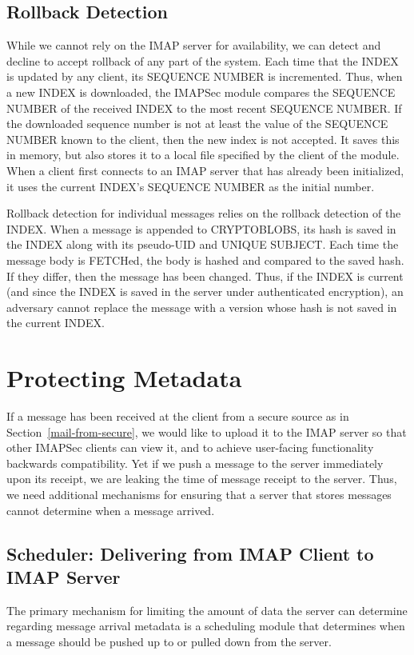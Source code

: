 \documentclass[pageno]{jpaper}
\newcommand{\project}{IMAPSec }
\begin{document}
\label{rollback}
\subsection{Rollback Detection}
While we cannot rely on the IMAP server for availability, we can detect and decline to accept rollback of any part of the system. Each time that the INDEX is updated by any client, its SEQUENCE NUMBER is incremented. Thus, when a new INDEX is downloaded, the \project module compares the SEQUENCE NUMBER of the received INDEX to the most recent SEQUENCE NUMBER. If the downloaded sequence number is not at least the value of the SEQUENCE NUMBER known to the client, then the new index is not accepted. It saves this in memory, but also stores it to a local file specified by the client of the module. When a client first connects to an IMAP server that has already been initialized, it uses the current INDEX's SEQUENCE NUMBER as the initial number.

Rollback detection for individual messages relies on the rollback detection of the INDEX. When a message is appended to CRYPTOBLOBS, its hash is saved in the INDEX along with its pseudo-UID and UNIQUE SUBJECT. Each time the message body is FETCHed, the body is hashed and compared to the saved hash. If they differ, then the message has been changed. Thus, if the INDEX is current (and since the INDEX is saved in the server under authenticated encryption), an adversary cannot replace the message with a version whose hash is not saved in the current INDEX.


\section{Protecting Metadata}

If a message has been received at the client from a secure source as in Section~\ref{mail-from-secure}, we would like to upload it to the IMAP server so that other \project clients can view it, and to achieve user-facing functionality backwards compatibility. Yet if we push a message to the server immediately upon its receipt, we are leaking the time of message receipt to the server. Thus, we need additional mechanisms for ensuring that a server that stores messages cannot determine when a message arrived.

\subsection{Scheduler: Delivering from IMAP Client to IMAP Server}
The primary mechanism for limiting the amount of data the server can determine regarding message arrival metadata is a scheduling module that determines when a message should be pushed up to or pulled down from the server.
\end{document}

